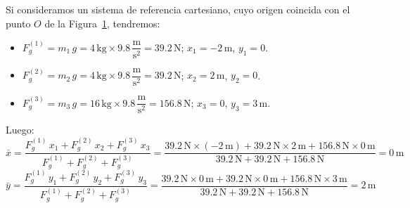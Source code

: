 \documentclass[addpoints]{exam}
\begin{document}
\begin{questions}
    \begin{figure}[ht]
    \centering
    \caption{ }
    \label{fig:cdg}
    \end{figure}

    \begin{solution}
    Si consideramos un sistema de referencia cartesiano, cuyo origen coincida con el punto $O$ de la Figura~\ref{fig:cdg}, tendremos:
    \begin{itemize}
        \item $F_{g}^{(1)} = m_1 \, g = 4 \, \text{kg} \times 9.8 \, \dfrac{\text{m}}{\text{s}^2} = 39.2 \, \text{N}$; $x_1 = - 2 \, \text{m}$, $y_1 = 0$.
        \item $F_{g}^{(2)} = m_2 \, g = 4 \, \text{kg} \times 9.8 \, \dfrac{\text{m}}{\text{s}^2} = 39.2 \, \text{N}$; $x_2 = 2 \, \text{m}$, $y_2 = 0$.
        \item $F_{g}^{(3)} = m_3 \, g = 16 \, \text{kg} \times 9.8 \, \dfrac{\text{m}}{\text{s}^2} = 156.8 \, \text{N}$; $x_3 = 0$, $y_3 = 3 \, \text{m}$.
    \end{itemize} Luego: $$\bar{x} = \frac{F_{g}^{(1)} \, x_1 + F_{g}^{(2)} \, x_2 + F_{g}^{(3)} \, x_3}{F_{g}^{(1)} + F_{g}^{(2)} + F_{g}^{(3)}} = \frac{39.2 \, \text{N} \times (-2 \, \text{m}) + 39.2 \, \text{N} \times 2 \, \text{m} + 156.8 \, \text{N} \times 0 \, \text{m}}{39.2 \, \text{N} + 39.2 \, \text{N} + 156.8 \, \text{N}} = 0 \, \text{m}$$ $$\bar{y} = \frac{F_{g}^{(1)} \, y_1 + F_{g}^{(2)} \, y_2 + F_{g}^{(3)} \, y_3}{F_{g}^{(1)} + F_{g}^{(2)} + F_{g}^{(3)}} = \frac{39.2 \, \text{N} \times 0 \, \text{m} + 39.2 \, \text{N} \times 0 \, \text{m} + 156.8 \, \text{N} \times 3 \, \text{m}}{39.2 \, \text{N} + 39.2 \, \text{N} + 156.8 \, \text{N}} = 2 \, \text{m}$$
    \end{solution}


\end{questions}
\end{document}
